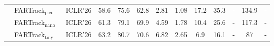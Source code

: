 \begin{table}[tb]
{\begin{tabular}{c l| c| c c c| c c| c c c c c}
                            & FARTrack$_\text{pico}$~\cite{wang2026fartrack} & ICLR'26             & 58.6                 & 75.6                       & 62.8                   & 2.81                             & 1.08  & 17.2          & 35.3        & -     & 134.9               & -    \\
                            & FARTrack$_\text{nano}$~\cite{wang2026fartrack} & ICLR'26             & 61.3                 & 79.1                       & 69.9                   & 4.59                             & 1.78  & 10.4          & 25.6        & -     & 117.3                & -    \\
                            & FARTrack$_\text{tiny}$~\cite{wang2026fartrack} & ICLR'26             & 63.2                 & 80.7                       & 70.6                   & 6.82                             & 2.65  & 6.9          & 16.1        & -     & 87                & -    \\

\end{tabular}}
\end{table}
